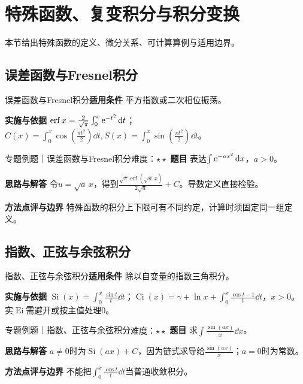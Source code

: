 \section{特殊函数、复变积分与积分变换}\label{mat:special_integrals}
\begin{examtip}本节给出特殊函数的定义、微分关系、可计算算例与适用边界。\end{examtip}
\subsection{误差函数与Fresnel积分}\label{mat:special_integrals:erf}
\begin{method}{误差函数与Fresnel积分}\textbf{适用条件} 平方指数或二次相位振荡。\par\textbf{实施与依据} $\operatorname{erf}x=\frac2{\sqrt\pi}\int_0^x\mathrm{e}^{-t^2}\mathop{}\!\mathrm{d} t$；$C(x)=\int_0^x\cos(\frac{\pi t^2}{2})\dd t,S(x)=\int_0^x\sin(\frac{\pi t^2}{2})\dd t$。\end{method}
\begin{example}{专题例题｜误差函数与Fresnel积分}{难度：$\star\star$}
\textbf{题目} 表达$\int\mathrm{e}^{-a x^2}\mathop{}\!\mathrm{d} x$，$a>0$。\par\textbf{思路与解答} 令$u=\sqrt a\,x$，得到$\frac{\sqrt\pi\operatorname{erf}(\sqrt a\,x)}{2\sqrt a}+C$。导数定义直接检验。\par\textbf{方法点评与边界} 特殊函数的积分上下限可有不同约定，计算时须固定同一组定义。
\end{example}
\subsection{指数、正弦与余弦积分}\label{mat:special_integrals:sici}
\begin{method}{指数、正弦与余弦积分}\textbf{适用条件} 除以自变量的指数三角积分。\par\textbf{实施与依据} $\operatorname{Si}(x)=\int_0^x\frac{\sin t}{t}\dd t$；$\operatorname{Ci}(x)=\gamma+\ln x+\int_0^x\frac{\cos t-1}{t}\dd t$，$x>0$。实$\operatorname{Ei}$需避开或按主值处理0。\end{method}
\begin{example}{专题例题｜指数、正弦与余弦积分}{难度：$\star\star$}
\textbf{题目} 求$\int\frac{\sin(ax)}{x}\dd x$。\par\textbf{思路与解答} $a\ne0$时为$\operatorname{Si}(ax)+C$，因为链式求导给$\frac{\sin(ax)}{x}$；$a=0$时为常数。\par\textbf{方法点评与边界} 不能把$\int_0^x\frac{\cos t}{t}\dd t$当普通收敛积分。
\end{example}
